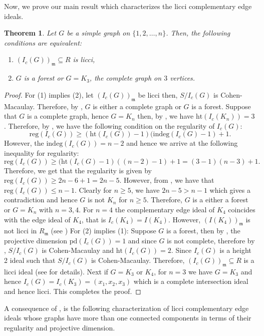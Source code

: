 \documentclass[oneside, 12pt]{amsart} \topmargin      -10mm \textwidth      160 true mm
\newtheorem{theorem}{Theorem}[section]
\theoremstyle{definition}
\numberwithin{equation}{section}
\begin{document}
Now, we prove our main result which characterizes the licci complementary edge ideals.
\begin{theorem}\label{main theorem}
 Let $G$ be a simple graph on $\{1,2,\dots,n\}$. Then, the following conditions are equivalent:
 \begin{enumerate}
\item  $(I_c(G))_\mathfrak{m} \subseteq R$ is licci,
\item $G$ is a forest or $G=K_3$, the complete graph on $3$ vertices.
\end{enumerate}
\end{theorem}
\begin{proof}
For (1) implies (2), let $(I_c(G))_\mathfrak{m}$ be licci then, $S/I_c(G)$ is Cohen-Macaulay. Therefore, by , $G$ is either a complete graph or $G$ is a forest. Suppose that $G$ is a complete graph, hence $G=K_n$ then, by , we have $\mathrm{ht}(I_c(K_n))=3$. Therefore, by , we have the following condition on the regularity of $I_c(G)$:
$$\mathrm{reg}(I_c(G))\geq (\mathrm{ht}(I_c(G))-1)(\mathrm{indeg}(I_c(G)-1)+1.$$
However, the $\mathrm{indeg}(I_c(G))=n-2$ and hence we arrive at the following inequality for regularity:
$$\mathrm{reg}(I_c(G)) \geq(\mathrm{ht}(I_c(G)-1)((n-2)-1)+1=(3-1)(n-3)+1.$$
Therefore, we get that the regularity is given by $\mathrm{reg}(I_c(G))\geq 2n-6+1=2n-5$. However, from , we have that $\mathrm{reg}(I_c(G)) \leq n-1$. Clearly for $n \geq 5$, we have  $2n-5 > n-1$ which gives a contradiction and hence $G$ is not $K_n$ for $n \geq 5$. Therefore, $G$ is a either a forest or $G=K_n$ with $n=3,4$. For $n=4$ the complementary edge ideal of $K_4$ coincides with the edge ideal of $K_4$, that is $I_c(K_4)=I(K_4)$. However, $(I(K_4))_{\mathfrak{m}}$ is  not  licci in $R_\mathfrak{m}$ (see \cite[Theorem~3.7.]{LicciEdgeIdeals})  For (2) implies (1): Suppose $G$ is a forest, then by , the projective dimension $\mathrm{pd}(I_c(G
))=1$ and since $G$ is not complete, therefore by , $S/I_c(G)$ is Cohen-Macaulay and $\mathrm{ht}(I_c(G))=2$. Since $I_c(G)$ is a height 2 ideal such that  $S/I_c(G)$ is Cohen-Macaulay. Therefore,  $(I_c(G))_\mathfrak{m} \subseteq R$ is a licci ideal (see \cite{peskine1974liaison} for details). Next if $G=K_3 \text{ or } K_4$, for $n=3$ we have $G=K_3$ and hence $I_c(G)=I_c(K_3)=(x_1,x_2,x_3)$ which is a complete intersection ideal and hence licci. This completes the proof.
\end{proof}
A consequence of , is the following characterization of licci complementary edge ideals whose graphs have more than one connected components in terms of their regularity and projective dimension.
\end{document}

